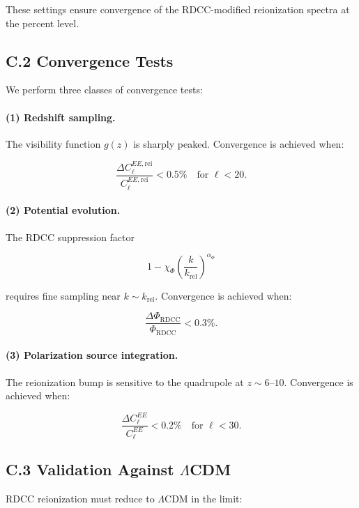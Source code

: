 \documentclass[11pt,a4paper]{article}
\begin{document}
These settings ensure convergence of the RDCC-modified reionization spectra at the percent
level.

\subsection*{C.2 Convergence Tests}

We perform three classes of convergence tests:

\paragraph{(1) Redshift sampling.}
The visibility function $g(z)$ is sharply peaked.  
Convergence is achieved when:


\[
\frac{\Delta C_{\ell}^{EE,\mathrm{rei}}}{C_{\ell}^{EE,\mathrm{rei}}} < 0.5\%
\quad \text{for } \ell < 20.
\]



\paragraph{(2) Potential evolution.}
The RDCC suppression factor


\[
1 - \chi_{\Phi}\left(\frac{k}{k_{\mathrm{rel}}}\right)^{\alpha_{\Phi}}
\]


requires fine sampling near $k \sim k_{\mathrm{rel}}$.  
Convergence is achieved when:


\[
\frac{\Delta \Phi_{\mathrm{RDCC}}}{\Phi_{\mathrm{RDCC}}} < 0.3\%.
\]



\paragraph{(3) Polarization source integration.}
The reionization bump is sensitive to the quadrupole at $z \sim 6$–$10$.  
Convergence is achieved when:


\[
\frac{\Delta C_{\ell}^{EE}}{C_{\ell}^{EE}} < 0.2\%
\quad \text{for } \ell < 30.
\]



\subsection*{C.3 Validation Against $\Lambda$CDM}

RDCC reionization must reduce to $\Lambda$CDM in the limit:
\end{document}
